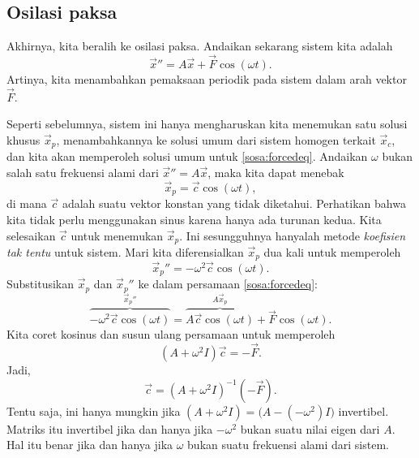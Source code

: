 \subsection{Osilasi paksa}

Akhirnya, kita beralih ke osilasi paksa.
Andaikan sekarang sistem kita adalah
\begin{equation} \label{sosa:forcedeq}
{\vec{x}}'' = A \vec{x} + \vec{F} \cos ( \omega t) .
\end{equation}
Artinya, kita menambahkan pemaksaan periodik pada sistem dalam arah
vektor $\vec{F}$.

Seperti sebelumnya, sistem ini hanya mengharuskan kita menemukan satu solusi khusus
$\vec{x}_p$, menambahkannya ke solusi umum dari sistem homogen terkait
$\vec{x}_c$, dan kita akan memperoleh solusi umum untuk \eqref{sosa:forcedeq}.
Andaikan $\omega$ bukan salah satu frekuensi alami dari
${\vec{x}}'' = A \vec{x}$, maka kita dapat menebak
\begin{equation*}
\vec{x}_p = \vec{c} \cos (\omega t) ,
\end{equation*}
di mana $\vec{c}$ adalah suatu vektor konstan yang tidak diketahui.  Perhatikan bahwa kita tidak perlu
menggunakan sinus karena hanya ada turunan kedua.  Kita selesaikan $\vec{c}$ untuk
menemukan $\vec{x}_p$.  Ini sesungguhnya hanyalah metode
\emph{koefisien tak tentu}
untuk sistem.  Mari kita diferensialkan $\vec{x}_p$ dua kali untuk memperoleh
\begin{equation*}
{\vec{x}_p}'' = -\omega^2 \vec{c} \cos (\omega t) .
\end{equation*}
Substitusikan $\vec{x}_p$ dan ${\vec{x}_p}''$ ke dalam persamaan \eqref{sosa:forcedeq}:
\begin{equation*}
\overbrace{
-\omega^2 \vec{c} \cos (\omega t)
}^{{\vec{x}_p}''}
=
\overbrace{
A \vec{c} \cos (\omega t) 
}^{A \vec{x}_p}
+ \vec{F} \cos (\omega t) .
\end{equation*}
Kita coret kosinus dan susun ulang persamaan untuk memperoleh
\begin{equation*}
(A +\omega^2 I) \vec{c}
=
- \vec{F} .
\end{equation*}
Jadi,
\begin{equation*}
\vec{c}
=
{(A +\omega^2 I)}^{-1}
(-\vec{F} ).
\end{equation*}
Tentu saja, ini hanya mungkin jika
$(A+ \omega^2 I) = \bigl(A- (-\omega^2) I\bigr)$
invertibel.  Matriks itu invertibel jika dan hanya jika
$-\omega^2$ bukan suatu nilai eigen dari $A$.  Hal itu benar jika dan hanya jika $\omega$
bukan suatu frekuensi alami dari sistem.


